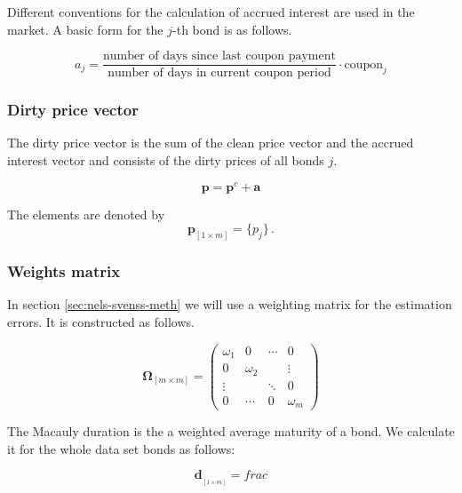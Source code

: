 Different conventions for the calculation of accrued interest are used in the market. A basic form for the $j$-th bond is as follows.

\begin{equation}
    a_j= \frac{\mbox{number of days since last coupon payment}}{\mbox{number of days in current coupon period}}\cdot \mbox{coupon}_j
\end{equation}
 	

\subsubsection*{Dirty price vector}

The dirty price vector is the sum of the clean price vector and the accrued interest vector and consists of the dirty prices of all bonds $j$.

\begin{displaymath}
\bm{p}=\bm{p}^c+\bm{a}
\end{displaymath}

The elements are denoted by 
\begin{equation}\label{pd}
    \bm{p}_{\left[1\times m\right]}= \{p_j\}\,.
\end{equation}


\subsubsection*{Weights matrix}

In section \ref{sec:nels-svenss-meth} we will use a weighting matrix for the estimation errors. It is constructed  as follows.

\begin{equation}\label{weights}
    \bm{\Omega}_{\left[m\times m\right]}= \begin{pmatrix}
 \omega_1 & 0 &\cdots  &0  \\
 0 & \omega_2 &  & \vdots \\
 \vdots &  & \ddots & 0 \\
 0 &\cdots  &0  & \omega_m
\end{pmatrix}
\end{equation}

The Macauly duration is the a weighted average maturity of a bond. We calculate it for the whole data set bonds as follows:

\begin{equation}
  \label{eq:macaulayduration}
  \bm{d}__{\left[1\times m\right]}=frac{}{}
\end{equation}

